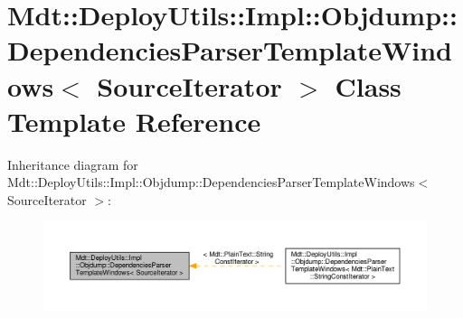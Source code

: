 \hypertarget{class_mdt_1_1_deploy_utils_1_1_impl_1_1_objdump_1_1_dependencies_parser_template_windows}{}\section{Mdt\+:\+:Deploy\+Utils\+:\+:Impl\+:\+:Objdump\+:\+:Dependencies\+Parser\+Template\+Windows$<$ Source\+Iterator $>$ Class Template Reference}
\label{class_mdt_1_1_deploy_utils_1_1_impl_1_1_objdump_1_1_dependencies_parser_template_windows}


Inheritance diagram for Mdt\+:\+:Deploy\+Utils\+:\+:Impl\+:\+:Objdump\+:\+:Dependencies\+Parser\+Template\+Windows$<$ Source\+Iterator $>$\+:
\nopagebreak
\begin{figure}[H]
\begin{center}
\leavevmode
\includegraphics[width=350pt]{class_mdt_1_1_deploy_utils_1_1_impl_1_1_objdump_1_1_dependencies_parser_template_windows__inherit__graph}
\end{center}
\end{figure}
